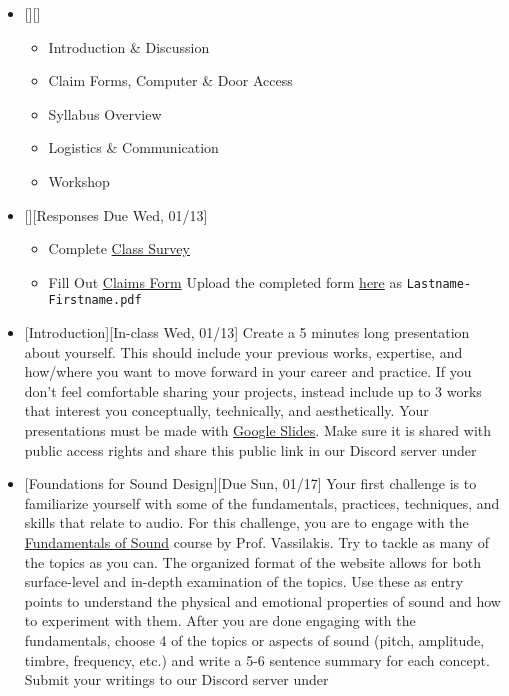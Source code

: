 \def\dMon{Mon, 01/11}
\def\dTues{Tues, 01/12}
\def\dWed{Wed, 01/13}
\def\dThur{Thur, 01/14}
\def\dFri{Fri, 01/15}
\def\dSat{Sat, 01/16}
\def\dSun{Sun, 01/17}
\placeDate


\begin{itemize}[noitemsep,topsep=0pt,leftmargin=*]
      \item {}[][]
            \begin{itemize}
                  \item Introduction \& Discussion
                  \item Claim Forms, Computer \& Door Access
                  \item Syllabus Overview
                  \item Logistics \& Communication
                  \item Workshop
            \end{itemize}
      \item {}[][Responses Due \dWed]
            \begin{itemize}
                  \item Complete \href{https://forms.gle/RnFhT6QbLLC9UYqm7}{Class Survey}
                  \item Fill Out \href{https://drive.google.com/file/d/1SeksTmFmQa6uehrmoSIL_uO8tuORo0P3/view}{Claims Form}
                        \newline Upload the completed form \href{https://osu.app.box.com/f/21e679a1efd4425b869edf8df0c4c77a}{here} as \texttt{Lastname-Firstname.pdf}
            \end{itemize}
      \item {}[Introduction][In-class \dWed] \newline Create a 5 minutes long presentation about yourself. This should include your previous works, expertise, and how/where you want to move forward in your career and practice. If you don't feel comfortable sharing your projects, instead include up to 3 works that interest you conceptually, technically, and aesthetically. Your presentations must be made with \href{https://docs.google.com/presentation/}{Google Slides}. Make sure it is shared with public access rights and share this public link in our Discord server under 
      \item {}[Foundations for Sound Design][Due \dSun]
            \newline Your first challenge is to familiarize yourself with some of the fundamentals, practices, techniques, and skills that relate to audio. For this challenge, you are to engage with the \href{http://www.acousticslab.org/RECA220/}{Fundamentals of Sound} course by Prof. Vassilakis. Try to tackle as many of the topics as you can. The organized format of the website allows for both surface-level and in-depth examination of the topics. Use these as entry points to understand the physical and emotional properties of sound and how to experiment with them. After you are done engaging with the fundamentals, choose 4 of the topics or aspects of sound (pitch, amplitude, timbre, frequency, etc.) and write a 5-6 sentence summary for each concept. Submit your writings to our Discord server under \discordC

\end{itemize}
